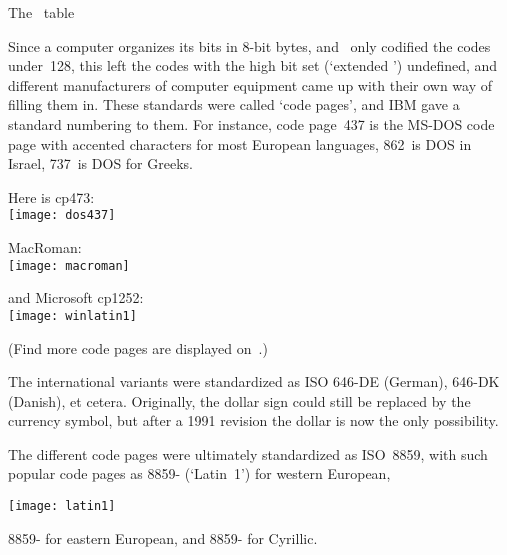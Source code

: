 \begin{table}[p]
  
  \caption{The \ascii\ table}
  \label{tab:ascii}
\end{table}

Since a computer organizes its bits in 8-bit bytes, and \ascii\ only
codified the codes under~128, this left the codes with the
high bit set (`extended
\ascii') undefined, and different manufacturers of computer equipment
came up with their own way of filling them in. These standards were
called `code pages', and IBM gave a standard
numbering to them. For instance, code page~437 is the MS-DOS code page
with accented characters for most European languages, 862~is DOS in
Israel, 737~is DOS for Greeks.

Here is cp473:\\
\texttt{[image: dos437]}

MacRoman:\\
\texttt{[image: macroman]}

and Microsoft cp1252:\\
\texttt{[image: winlatin1]}

(Find more code pages are displayed on~\cite{codepage}.)
\begin{comment}
These diagrams can be generated from Unicode mapping tables, which
look like
\begin{verbatim}
=20     U+0020  SPACE
=21     U+0021  EXCLAMATION MARK
=22     U+0022  QUOTATION MARK
...
=A3     U+00A3  POUND SIGN
=A4     U+20AC  EURO SIGN
=A5     U+00A5  YEN SIGN
...
\end{verbatim}
\end{comment}

The international variants were standardized as ISO 646-DE (German),
646-DK (Danish), et cetera. Originally, the dollar sign could still be
replaced by the currency symbol, but after a 1991 revision the dollar
is now the only possibility.


The
different code pages were ultimately standardized as ISO~8859, with such popular code pages as
8859- (`Latin~1') for western European,

\texttt{[image: latin1]}

8859- for
eastern European, and 8859- for Cyrillic.

